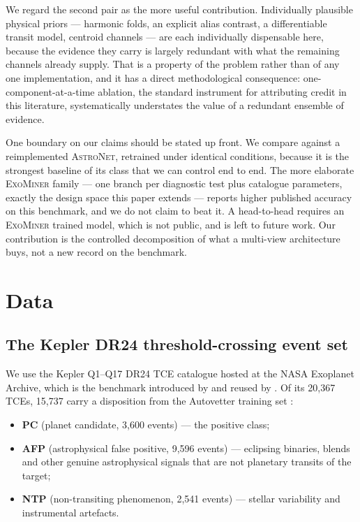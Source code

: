 \documentclass[preprint,12pt,authoryear]{elsarticle}
\newcommand{\astronet}{\textsc{AstroNet}}
\newcommand{\exominer}{\textsc{ExoMiner}}
\begin{document}
We regard the second pair as the more useful contribution. Individually
plausible physical priors --- harmonic folds, an explicit alias contrast, a
differentiable transit model, centroid channels --- are each individually
dispensable here, because the evidence they carry is largely redundant with what
the remaining channels already supply. That is a property of the problem rather
than of any one implementation, and it has a direct methodological consequence:
one-component-at-a-time ablation, the standard instrument for attributing credit
in this literature, systematically understates the value of a redundant
ensemble of evidence.

One boundary on our claims should be stated up front. We compare against a
reimplemented \astronet{}, retrained under identical conditions, because it is
the strongest baseline of its class that we can control end to end. The more
elaborate \exominer{} family \citep{Valizadegan2022} --- one branch per
diagnostic test plus catalogue parameters, exactly the design space this paper
extends --- reports higher published accuracy on this benchmark, and we do not
claim to beat it. A head-to-head requires an \exominer{} trained model, which is
not public, and is left to future work. Our contribution is the controlled
decomposition of what a multi-view architecture buys, not a new record on the
benchmark.

\section{Data}
\label{sec:data}

\subsection{The Kepler DR24 threshold-crossing event set}

We use the Kepler Q1--Q17 DR24 TCE catalogue hosted at the NASA Exoplanet
Archive, which is the benchmark introduced by \citet{Shallue2018} and reused by
\citet{Ansdell2018}. Of its 20{,}367 TCEs, 15{,}737 carry a disposition from the
Autovetter training set \citep{McCauliff2015}:

\begin{itemize}
\item \textbf{PC} (planet candidate, 3{,}600 events) --- the positive class;
\item \textbf{AFP} (astrophysical false positive, 9{,}596 events) --- eclipsing
      binaries, blends and other genuine astrophysical signals that are not
      planetary transits of the target;
\item \textbf{NTP} (non-transiting phenomenon, 2{,}541 events) --- stellar
      variability and instrumental artefacts.
\end{itemize}
\end{document}
